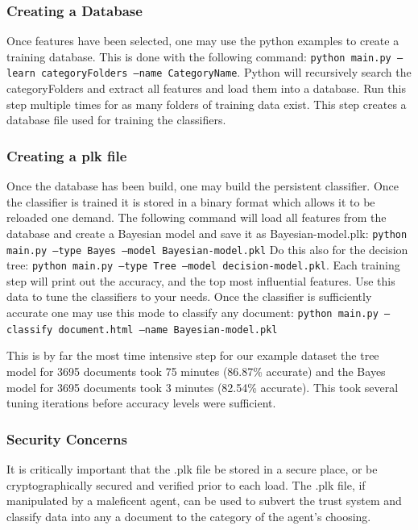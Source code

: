 \subsubsection{Creating a Database}
Once features have been selected, one may use the python examples to create
a training database. This is done with the following command: 
\texttt{python main.py --learn categoryFolders --name CategoryName}. Python
will recursively search the categoryFolders and extract all features and load
them into a database. Run this step multiple times for as many folders of
training data exist. This step creates a database file used for training the
classifiers.

\subsubsection{Creating a plk file}
Once the database has been build, one may build the persistent classifier. Once
the classifier is trained it is stored in a binary format which allows it to
be reloaded one demand. The following command will load all features from the
database and create a Bayesian model and save it as Bayesian-model.plk: 
\texttt{python main.py --type Bayes --model Bayesian-model.pkl}
Do this also for the decision tree: \texttt{python main.py --type Tree --model
decision-model.pkl}. Each training step will print out the accuracy, and the top
most influential features. Use this data to tune the classifiers to your needs.
Once the classifier is sufficiently accurate one may use this mode to classify
any document: \texttt{python main.py --classify document.html --name Bayesian-model.pkl}

This is by far the most time intensive step for our example dataset the tree
model for 3695 documents took 75 minutes (86.87\% accurate) and the Bayes
model for 3695 documents took 3 minutes (82.54\% accurate). This took several
tuning iterations before accuracy levels were sufficient. 

\subsubsection{Security Concerns}
It is critically important that the .plk file be stored in a secure place, or be
cryptographically secured and verified prior to each load. The .plk file, if
manipulated by a maleficent agent, can be used to subvert the trust system and
classify data into any a document to the category of the agent's choosing.  



